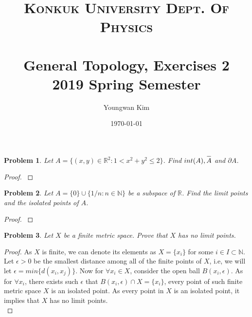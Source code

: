 \documentclass[paper=a4, fontsize=11pt]{scrartcl}
\title{	
	\normalfont \normalsize 
	\textsc{Konkuk University Dept. Of Physics} \\ [25pt] %
	\horrule{1pt} \\[0.4cm] 
	\huge General Topology, Exercises 2 \\
	\vspace{0.1in}
	\Large 2019 Spring Semester
	\horrule{1pt} \\[0.4cm] 
}
\author{Youngwan Kim}
\date{\normalsize\today}
\newcommand{\overbar}[1]{
	\mkern 1.5mu \overline{\mkern-1.5mu\raisebox{0pt}[\dimexpr\height+0.5mm\relax]{$#1$}\mkern-1.5mu}\mkern 1.5mu
}
\newtheorem{problem}{Problem}
\begin{document}
	
\maketitle	
\vspace{0.25in}

\begin{problem}
	Let $A=\{ (x,y) \in \mathbb{R}^2 : 1 < x^2+y^2 \leq 2 \}$. Find $int(A) , \overbar{A}$ and $\partial A$.\\
\end{problem}

\begin{proof}
$ $ \newline
\vspace{-0.15in}
\end{proof}

\begin{problem}
	Let $A=\{0\}\cup\{1/n : n \in \mathbb{N}\}$ be a subspace of $\mathbb{R}$. Find the limit points and the isolated points of $A$.\\
\end{problem}

\begin{proof}
$ $ \newline
\vspace{-0.15in}
\end{proof}

\begin{problem}
	Let $X$ be a finite metric space. Prove that $X$ has no limit points.\\
\end{problem}

\begin{proof}
	As $X$ is finite, we can denote its elements as $X=\{x_i\}$ for some $i\in I \subset \mathbb{N}$. Let $\epsilon>0$ be the smallest distance among all of the finite points of $X$, i.e, we will let $\epsilon = min\{ d(x_i,x_j) \}$. Now for $\forall x_i \in X$, consider the open ball $B(x_i,\epsilon)$. As for $\forall x_i$, there exists such $\epsilon$ that $B(x_i, \epsilon) \cap X = \{x_i\}$, every point of such finite metric space $X$ is an isolated point. As every point in $X$ is an isolated point, it implies that $X$ has no limit points. \\
\end{proof}
\end{document}
